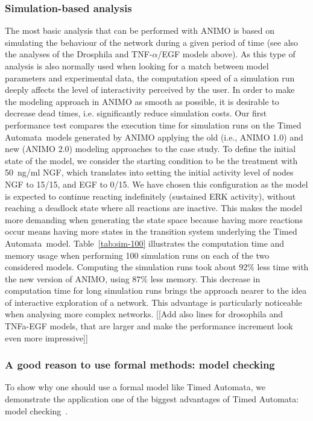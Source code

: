 \documentclass{bmcart}
\def\tas{Timed Automata}
\begin{document}
\subsubsection*{Simulation-based analysis}
The most basic analysis that can be performed with ANIMO is based on simulating the behaviour
of the network during a given period of time (see also the analyses
of the Drosphila and TNF-$\alpha$/EGF models above). As this type of analysis is also normally
used when looking for a match between model parameters and experimental data, the computation
speed of a simulation run deeply affects the level of interactivity perceived by the user.
In order to make
the modeling approach in ANIMO as smooth as possible, it is desirable to decrease dead times,
i.e. significantly reduce simulation costs.
Our first performance test compares the execution time for simulation runs on the \tas\ models
generated by ANIMO applying the old (i.e., ANIMO 1.0) and new (ANIMO 2.0) modeling approaches to the case study.
To define the initial state of the model, we consider the starting condition to be the treatment with 50~ng/ml NGF, which translates into
setting the initial activity level of nodes NGF to 15/15, and EGF to 0/15. We have chosen this configuration as the
model is expected to continue reacting indefinitely (sustained ERK activity), without reaching a deadlock state where all reactions are inactive.
This makes the model more demanding when generating the state space
because having more reactions occur means having more states in the transition system underlying the \tas\ model.
Table~\ref{tab:sim-100} illustrates the computation time and memory usage when performing 100 simulation runs on each of the
two considered models. Computing the simulation runs took about $92 \%$ less time with the new version of ANIMO, using $87 \%$
less memory. This decrease in computation time for long simulation runs brings the approach nearer to the idea
of interactive exploration of a network. This advantage is particularly noticeable when analysing
more complex networks.
{\Large [[Add also lines for drosophila and TNFa-EGF models, that are larger and make the performance increment look even more impressive]]}


\subsubsection*{A good reason to use formal methods: model checking}
To show why one should use a formal model like \tas, we demonstrate the application
one of the biggest advantages of \tas: model checking~\cite{model-checking}.
\end{document}
